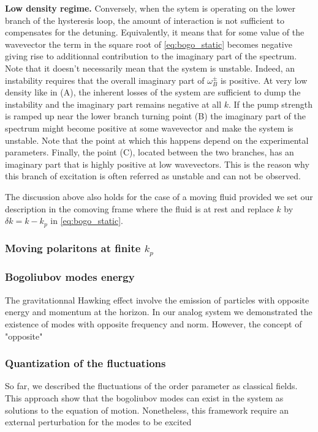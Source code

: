 \bigskip

\textbf{Low density regime.} Conversely, when the sytem is operating on the lower branch of the hysteresis loop, the amount of interaction is not sufficient to 
compensates for the detuning. Equivalently, it means that for some value of the wavevector the term in the square root of \autoref{eq:bogo_static} becomes negative
giving rise to additionnal contribution to the imaginary part of the spectrum. Note that it doesn't necessarily mean that the system is unstable. Indeed, an instability 
requires that the overall imaginary part of $\omega^{\pm}_B$ is positive. At very low density like in (A), the inherent losses of the system 
are sufficient to dump the instability and the imaginary part remains negative at all $k$. If the pump strength is ramped up near the lower branch turning point (B) 
the imaginary part of the spectrum might become positive at some wavevector and make the system is unstable. Note that the point at which this happens depend on the experimental
parameters. Finally, the point (C), located between the two branches, has an imaginary part that is highly positive at low wavevectors. This is the reason why this branch of excitation
is often referred as unstable and can not be observed. 


\bigskip 

The discussion above also holds for the case of a moving fluid provided we set our description in the comoving frame where the fluid is at rest and replace $k$ by $\delta k=k-k_p$ in \autoref{eq:bogo_static}.

\subsubsection{Moving polaritons at finite $k_p$}


\subsubsection{Bogoliubov modes energy}
The gravitationnal Hawking effect involve the emission of particles with opposite energy and momentum at the horizon. In our analog
system we demonstrated the existence of modes with opposite frequency and norm. However, the concept of "opposite" 

\subsubsection{Quantization of the fluctuations}
So far, we described the fluctuations of the order parameter as classical fields. This approach
show that the bogoliubov modes can exist in the system as solutions to the equation of motion. Nonetheless, this framework require 
an external perturbation for the modes to be excited
